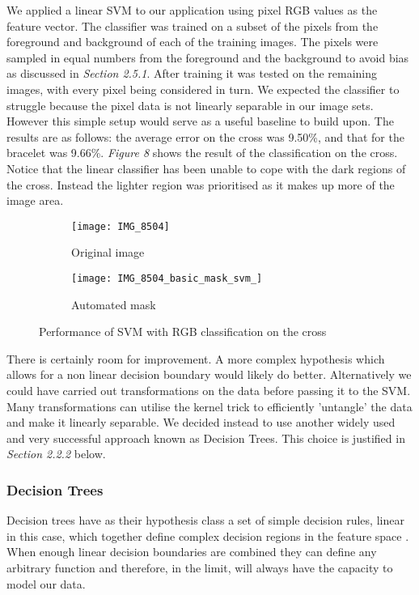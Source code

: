 \documentclass[12pt]{IIBproject}
\begin{document}
We applied a linear SVM to our application using pixel RGB values as the feature vector. The classifier was trained on a subset of the pixels from the foreground and background of each of the training images. The pixels were sampled in equal numbers from the foreground and the background  to avoid bias as discussed in \emph{Section 2.5.1}. After training it was tested on the remaining images, with every pixel being considered in turn. We expected the classifier to struggle because the pixel data is not linearly separable in our image sets.  However this simple setup would serve as a useful baseline to build upon. The results are as follows: the average error on the cross was 9.50\%, and that for the bracelet was 9.66\%. \emph{Figure 8} shows the result of the classification on the cross. Notice that the linear classifier has been unable to cope with the dark regions of the cross. Instead the lighter region was prioritised as it makes up more of the image area.
\begin{figure}[H]
\centering
\begin{subfigure}{.5\textwidth}
  \centering
  \texttt{[image: IMG\_8504]}
  \caption{Original image}
  \label{fig:sub1}
\end{subfigure}%
\begin{subfigure}{.5\textwidth}
  \centering
  \texttt{[image: IMG\_8504\_basic\_mask\_svm\_]}
  \caption{Automated mask}
  \label{fig:sub2}
\end{subfigure}
\caption{Performance of SVM with RGB classification on the cross}
\label{fig:test}
\end{figure}

There is certainly room for improvement. A more complex hypothesis which allows for a non linear decision boundary would likely do better. Alternatively we could have carried out transformations on the data before passing it to the SVM. Many transformations can utilise the kernel trick \cite{scholkopft1999fisher} to efficiently 'untangle' the data and make it linearly separable. We decided instead to use another widely used and very successful approach known as Decision Trees. This choice is justified in \emph{Section 2.2.2} below.
\subsubsection{Decision Trees}

Decision trees have as their hypothesis class a set of simple decision rules, linear in this case, which together define complex decision regions in the feature space \cite{quinlan1986induction}.  When enough linear decision boundaries are combined they can define any arbitrary function and therefore, in the limit, will always have the capacity to model our data. 
\end{document}
